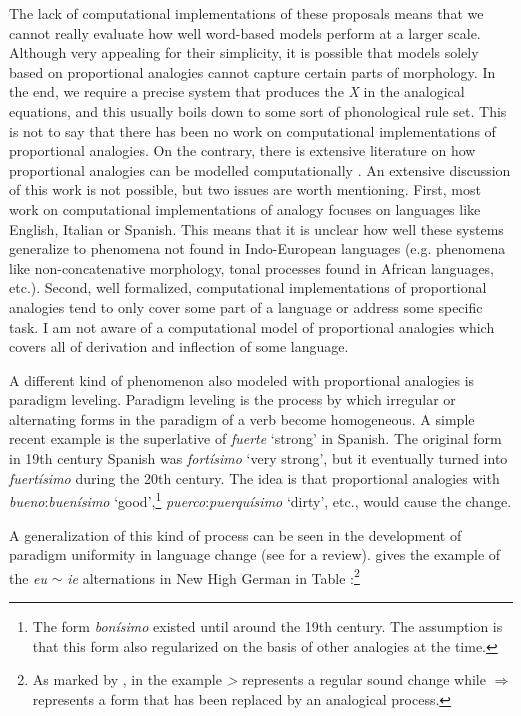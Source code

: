The lack of computational implementations of these proposals means that we cannot really evaluate how well word-based models perform at a larger scale. Although very appealing for their simplicity, it is possible that models solely based on proportional analogies cannot capture certain parts of morphology. In the end, we require a precise system that produces the \textit{X} in the analogical equations, and this usually boils down to some sort of phonological rule set. This is not to say that there has been no work on computational implementations of proportional analogies. On the contrary, there is extensive literature on how proportional analogies can be modelled computationally \autocites{Federici.1995b, Fertig.2013, Goldsmith.2007, Lepage.1998, Pirrelli.1994a, Pirrelli.1994, Yvon.1997}. An extensive discussion of this work is not possible, but two issues are worth mentioning. First, most work on computational implementations of analogy focuses on languages like English, Italian or Spanish. This means that it is unclear how well these systems generalize to phenomena not found in Indo-European languages (e.g. phenomena like non-concatenative morphology, tonal processes found in African languages, etc.). Second, well formalized, computational implementations of proportional analogies tend to only cover some part of a language or address some specific task. I am not aware of a computational model of proportional analogies which covers all of derivation and inflection of some language.


\largerpage
A different kind of phenomenon also modeled with proportional analogies is paradigm leveling. Paradigm leveling is the process by which irregular or alternating forms in the paradigm of a verb become homogeneous. A simple recent example is the superlative of \textit{fuerte} `strong' in Spanish. The original form in 19th century Spanish was \textit{f\emph{o}rtísimo} `very strong', but it eventually turned into \textit{f\emph{ue}rtísimo} during the 20th century. The idea is that proportional analogies with \textit{bueno}:\textit{buenísimo} `good',\footnote{The form \textit{bonísimo} existed until around the 19th century. The assumption is that this form also regularized on the basis of other analogies at the time.} \textit{puerco}:\textit{puerquísimo} `dirty', etc., would cause the change.

A generalization of this kind of process can be seen in the development of paradigm uniformity in language change (see \textcite{Albright.2008} for a review). \textcite[144]{Albright.2008} gives the example of the \textit{eu} $\sim$ \textit{ie} alternations in New High German in Table :\footnote{As marked by \textcite[144]{Albright.2008}, in the example \emph{>} represents a regular sound change while $\Rightarrow$ represents a form that has been replaced by an analogical process.}

